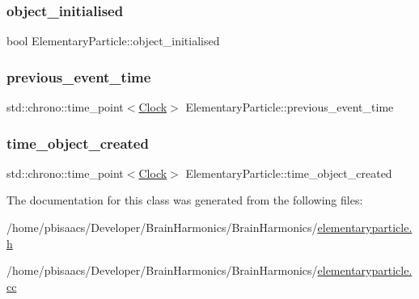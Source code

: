 \subsubsection{\texorpdfstring{object\+\_\+initialised}{object\_initialised}}
{\footnotesize\ttfamily bool Elementary\+Particle\+::object\+\_\+initialised\hspace{0.3cm}{\ttfamily [private]}}

\mbox{\label{classElementaryParticle_a8b0b30058853d850c0853fc101f5d45c}} 
\subsubsection{\texorpdfstring{previous\+\_\+event\+\_\+time}{previous\_event\_time}}
{\footnotesize\ttfamily std\+::chrono\+::time\+\_\+point$<$\mbox{\hyperlink{universe_8h_a0ef8d951d1ca5ab3cfaf7ab4c7a6fd80}{Clock}}$>$ Elementary\+Particle\+::previous\+\_\+event\+\_\+time\hspace{0.3cm}{\ttfamily [private]}}

\mbox{\label{classElementaryParticle_af7a592e44e4ccc8f1b19cd4c49ab50c3}} 
\subsubsection{\texorpdfstring{time\+\_\+object\+\_\+created}{time\_object\_created}}
{\footnotesize\ttfamily std\+::chrono\+::time\+\_\+point$<$\mbox{\hyperlink{universe_8h_a0ef8d951d1ca5ab3cfaf7ab4c7a6fd80}{Clock}}$>$ Elementary\+Particle\+::time\+\_\+object\+\_\+created\hspace{0.3cm}{\ttfamily [private]}}



The documentation for this class was generated from the following files\+:\begin{DoxyCompactItemize}
\item 
/home/pbisaacs/\+Developer/\+Brain\+Harmonics/\+Brain\+Harmonics/\mbox{\hyperlink{elementaryparticle_8h}{elementaryparticle.\+h}}\item 
/home/pbisaacs/\+Developer/\+Brain\+Harmonics/\+Brain\+Harmonics/\mbox{\hyperlink{elementaryparticle_8cc}{elementaryparticle.\+cc}}\end{DoxyCompactItemize}
